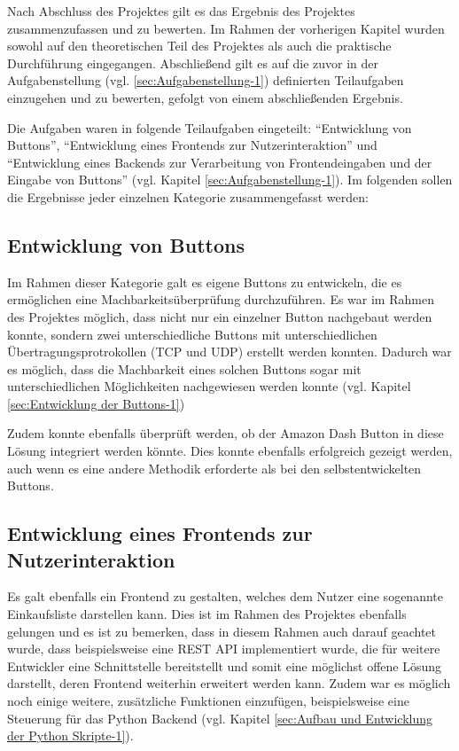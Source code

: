 Nach Abschluss des Projektes gilt es das Ergebnis des Projektes zusammenzufassen und zu bewerten. Im Rahmen der vorherigen Kapitel wurden sowohl auf den theoretischen Teil des Projektes als auch die praktische Durchführung eingegangen. Abschließend gilt es auf die zuvor in der Aufgabenstellung (vgl. \ref{sec:Aufgabenstellung-1}) definierten Teilaufgaben einzugehen und zu bewerten, gefolgt von einem abschließenden Ergebnis. 

Die Aufgaben waren in folgende Teilaufgaben eingeteilt: ``Entwicklung von Buttons'', ``Entwicklung eines Frontends zur Nutzerinteraktion'' und ``Entwicklung eines Backends zur Verarbeitung von Frontendeingaben und der Eingabe von Buttons'' (vgl. Kapitel \ref{sec:Aufgabenstellung-1}). Im folgenden sollen die Ergebnisse jeder einzelnen Kategorie zusammengefasst werden:

\subsection{Entwicklung von Buttons}
\label{sec:ErgebnisButtons}
Im Rahmen dieser Kategorie galt es eigene Buttons zu entwickeln, die es ermöglichen eine Machbarkeitsüberprüfung durchzuführen. Es war im Rahmen des Projektes möglich, dass nicht nur ein einzelner Button nachgebaut werden konnte, sondern zwei unterschiedliche Buttons mit unterschiedlichen Übertragungsprotrokollen (TCP und UDP) erstellt werden konnten. Dadurch war es möglich, dass die Machbarkeit eines solchen Buttons sogar mit unterschiedlichen Möglichkeiten nachgewiesen werden konnte (vgl. Kapitel \ref{sec:Entwicklung der Buttons-1})

Zudem konnte ebenfalls überprüft werden, ob der Amazon Dash Button in diese Lösung integriert werden könnte. Dies konnte ebenfalls erfolgreich gezeigt werden, auch wenn es eine andere Methodik erforderte als bei den selbstentwickelten Buttons.

\subsection{Entwicklung eines Frontends zur Nutzerinteraktion}
\label{sec:ErgebnisFrontend}
Es galt ebenfalls ein Frontend zu gestalten, welches dem Nutzer eine sogenannte Einkaufsliste darstellen kann. Dies ist im Rahmen des Projektes ebenfalls gelungen und es ist zu bemerken, dass in diesem Rahmen auch darauf geachtet wurde, dass beispielsweise eine \ac{REST} \ac{API} implementiert wurde, die für weitere Entwickler eine Schnittstelle bereitstellt und somit eine möglichst offene Lösung darstellt, deren Frontend weiterhin erweitert werden kann. Zudem war es möglich noch einige weitere, zusätzliche Funktionen einzufügen, beispielsweise eine Steuerung für das Python Backend (vgl. Kapitel \ref{sec:Aufbau und Entwicklung der Python Skripte-1}). 

